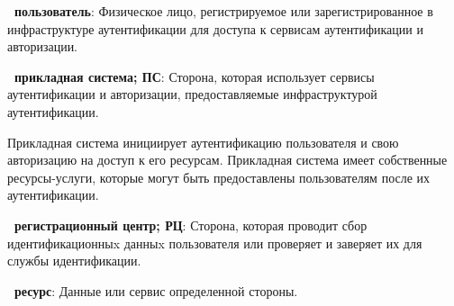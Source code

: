 %





{\bf \thedefctr~пользователь}:
Физическое лицо, регистрируемое или зарегистрированное в инфраструктуре
аутентификации для доступа к сервисам аутентификации и авторизации.
                

{\bf \thedefctr~прикладная система; ПС}:
Сторона, которая использует сервисы аутентификации и авторизации,
предоставляемые инфраструктурой аутентификации.

\begin{note*}
Прикладная система инициирует аутентификацию пользователя и свою авторизацию на
доступ к его ресурсам.
%
Прикладная система имеет собственные ресурсы-услуги, которые могут быть
предоставлены пользователям после их аутентификации.
\end{note*}

{\bf \thedefctr~регистрационный центр; РЦ}:
Сторона, которая проводит сбор идентификационныx данныx пользователя или 
проверяет и заверяет их для службы идентификации.


{\bf \thedefctr~ресурс}:
Данные или сервис определенной стороны. 

